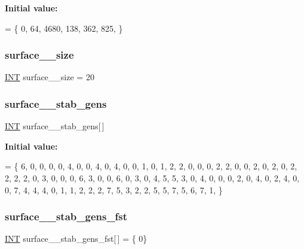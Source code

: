 {\bfseries Initial value\+:}
\begin{DoxyCode}
= \{ 
    0, 64, 4680, 138, 362, 825, 
\}
\end{DoxyCode}
\mbox{\label{surface__8_8_c_a789fedd88b77c534ada4af428bc5b121}} 
\subsubsection{\texorpdfstring{surface\+\_\+\_\+size}{surface\_8\_size}}
{\footnotesize\ttfamily \mbox{\hyperlink{galois_8h_a09fddde158a3a20bd2dcadb609de11dc}{I\+NT}} surface\+\_\+\_\+size = 20}

\mbox{\label{surface__8_8_c_a96cfe6bc9a30da26d82d13c89a5c5647}} 
\subsubsection{\texorpdfstring{surface\+\_\+\_\+stab\+\_\+gens}{surface\_8\_stab\_gens}}
{\footnotesize\ttfamily \mbox{\hyperlink{galois_8h_a09fddde158a3a20bd2dcadb609de11dc}{I\+NT}} surface\+\_\+\_\+stab\+\_\+gens\mbox{[}$\,$\mbox{]}}

{\bfseries Initial value\+:}
\begin{DoxyCode}
= \{
    6, 0, 0, 0, 0, 4, 0, 0, 4, 0, 4, 0, 0, 1, 0, 1, 2, 
    2, 0, 0, 0, 2, 2, 0, 0, 2, 0, 2, 0, 2, 2, 2, 2, 0, 
    3, 0, 0, 0, 6, 3, 0, 0, 6, 0, 3, 0, 4, 5, 5, 3, 0, 
    4, 0, 0, 0, 2, 0, 4, 0, 2, 4, 0, 0, 7, 4, 4, 4, 0, 
    1, 1, 2, 2, 2, 7, 5, 3, 2, 2, 5, 5, 7, 5, 6, 7, 1, 
\}
\end{DoxyCode}
\mbox{\label{surface__8_8_c_a5094eb8cf20c94cfdd5a5f52e1545b71}} 
\subsubsection{\texorpdfstring{surface\+\_\+\_\+stab\+\_\+gens\+\_\+fst}{surface\_8\_stab\_gens\_fst}}
{\footnotesize\ttfamily \mbox{\hyperlink{galois_8h_a09fddde158a3a20bd2dcadb609de11dc}{I\+NT}} surface\+\_\+\_\+stab\+\_\+gens\+\_\+fst\mbox{[}$\,$\mbox{]} = \{ 0\}}

